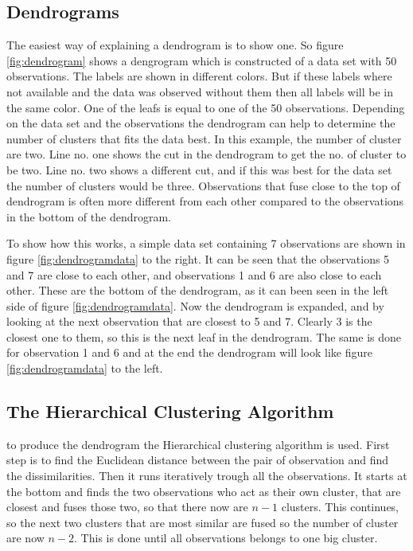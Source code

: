 \subsection{Dendrograms}
The easiest way of explaining a dendrogram is to show one. So figure \ref{fig:dendrogram} shows a dengrogram which is constructed of a data set with 50 observations.
The labels are shown in different colors. But if these labels where not available and the data was observed without them then all labels will be in the same color. 
One of the leafs is equal to one of the 50 observations. 
Depending on the data set and the observations the dendrogram can help to determine the number of clusters that fits the data best. In this example, the number of cluster are two. Line no. one shows the cut in the dendrogram to get the no. of cluster to be two. Line no. two shows a different cut, and if this was best for the data set the number of clusters would be three.
Observations that fuse close to the top of dendrogram is often more different from each other compared to the observations in the bottom of the dendrogram. 


\FloatBarrier
To show how this works, a simple data set containing 7 observations are shown in figure \ref{fig:dendrogramdata} to the right.
It can be seen that the observations 5 and 7 are close to each other, and observations 1 and 6 are also close to each other. These are the bottom of the dendrogram, as it can been seen in the left side of figure \ref{fig:dendrogramdata}. Now the dendrogram is expanded, and by looking at the next observation that are closest to 5 and 7. Clearly 3 is the closest one to them, so this is the next leaf in the dendrogram. The same is done for observation 1 and 6 and at the end the dendrogram will look like figure \ref{fig:dendrogramdata} to the left.


\FloatBarrier
\subsection{The Hierarchical Clustering Algorithm}
to produce the dendrogram the Hierarchical clustering algorithm is used. First step is to find the Euclidean distance between the pair of observation and find the dissimilarities.
Then it runs iteratively trough all the observations. It starts at the bottom and finds the two observations who act as their own cluster, that are closest and fuses those two, so that there now are $n-1$ clusters. This continues, so the next two clusters that are most similar are fused so the number of cluster are now $n-2$. This is done until all observations belongs to one big cluster.

